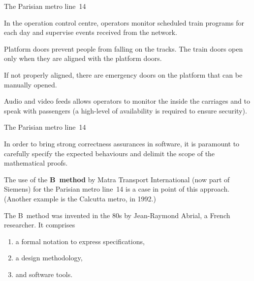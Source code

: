 \documentclass[compress,dvips,xcolor={dvipsnames},t]{beamer}
\begin{document}
%
\begin{frame}{The Parisian metro line~14}

  In the operation control centre, operators monitor scheduled train
  programs for each day and supervise events received from the
  network.

  \bigskip

  Platform doors prevent people from falling on the tracks. The train
  doors open only when they are aligned with the platform doors.

  \bigskip

  If not properly aligned, there are emergency doors on the platform
  that can be manually opened.

  \bigskip

  Audio and video feeds allows operators to monitor the inside the
  carriages and to speak with passengers (a high\hyp{}level of
  availability is required to ensure security).

\end{frame}

%
\begin{frame}{The Parisian metro line~14}

  In order to bring strong correctness assurances in software, it is
  paramount to carefully specify the expected behaviours and delimit
  the scope of the mathematical proofs.

  \bigskip

  The use of the \textbf{B~method} by Matra Transport International
  (now part of Siemens) for the Parisian metro line~14 is a case in
  point of this approach. (Another example is the Calcutta metro, in
  1992.)

  \bigskip

   The B~method was invented in the 80s by Jean-Raymond Abrial, a
   French researcher. It comprises
   \begin{enumerate}

     \item a formal notation to express specifications,

     \item a design methodology,

     \item and software tools.

   \end{enumerate}

\end{frame}
\end{document}
